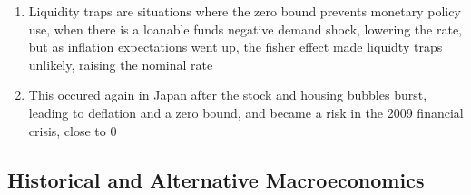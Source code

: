 \documentclass[11 pt, twoside]{article}
\begin{document}
\begin{enumerate}
\begin{enumerate}
\item Liquidity traps are situations where the zero bound prevents monetary policy use, when there is a loanable funds negative demand shock, lowering the rate, but as inflation expectations went up, the fisher effect made liquidty traps unlikely, raising the nominal rate
\item This occured again in Japan after the stock and housing bubbles burst, leading to deflation and a zero bound, and became a risk in the 2009 financial crisis, close to 0
\end{enumerate}
\end{enumerate}

\subsection{Historical and Alternative Macroeconomics}
\end{document}
